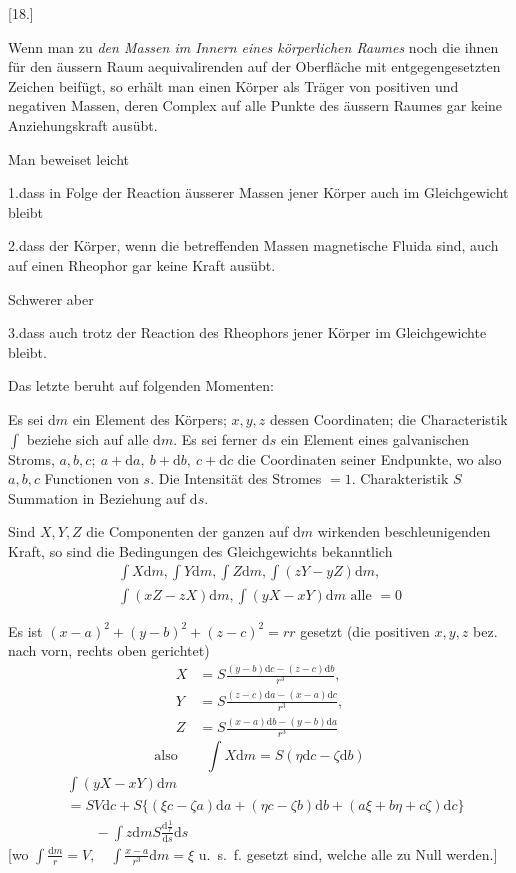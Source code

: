 \begin{center}[18.]\end{center}
Wenn man zu \textit{den Massen im Innern eines körperlichen Raumes} noch die ihnen für den äussern Raum aequivalirenden auf der Oberfläche mit entgegengesetzten Zeichen beifügt, so erhält man einen Körper als Träger von positiven und negativen Massen, deren Complex auf alle Punkte des äussern Raumes gar keine Anziehungskraft ausübt.

Man beweiset leicht

1.\quad dass in Folge der Reaction äusserer Massen jener Körper auch im Gleichgewicht bleibt

2.\quad dass der Körper, wenn die betreffenden Massen magnetische Fluida sind, auch auf einen Rheophor gar keine Kraft ausübt.

Schwerer aber

3.\quad dass auch trotz der Reaction des Rheophors jener Körper im Gleichgewichte bleibt.

Das letzte beruht auf folgenden Momenten:

Es sei $\mathrm dm$ ein Element des Körpers; $x,y,z$ dessen Coordinaten; die Characteristik $\int$ beziehe sich auf alle $\mathrm dm$. Es sei ferner $\mathrm ds$ ein Element eines galvanischen Stroms, $a,b,c;\ a+\mathrm da,\ b+\mathrm db,\ c+\mathrm dc$ die Coordinaten seiner Endpunkte, wo also $a,b,c$ Functionen von $s$. Die Intensität des Stromes $=1$. Charakteristik $S$ Summation in Beziehung auf $\mathrm ds$.

Sind $X,Y,Z$ die Componenten der ganzen auf $\mathrm dm$ wirkenden beschleunigenden Kraft, so sind die Bedingungen des Gleichgewichts bekanntlich
\[
\begin{gathered}
\int X\mathrm dm,\int Y\mathrm dm,\int Z\mathrm dm,\int(zY-yZ)\mathrm dm,\\
\int(xZ-zX)\mathrm dm,\int(yX-xY)\mathrm dm\text{ alle }=0
\end{gathered}
\]

Es ist $(x-a)^2+(y-b)^2+(z-c)^2=rr$ gesetzt (die positiven $x,y,z$ bez. nach vorn, rechts oben gerichtet)
\[
\begin{aligned}
X&=S\frac{(y-b)\mathrm dc-(z-c)\mathrm db}{r^3},\\
Y&=S\frac{(z-c)\mathrm da-(x-a)\mathrm dc}{r^3},\\
Z&=S\frac{(x-a)\mathrm db-(y-b)\mathrm da}{r^3}
\end{aligned}
\]
\[
\text{also}\qquad\int X\mathrm dm=S(\eta\mathrm dc-\zeta\mathrm db)
\]
\[
\begin{aligned}
&\int(yX-xY)\mathrm dm\\
&=SV\mathrm dc+S\{(\xi c-\zeta a)\mathrm da+(\eta c-\zeta b)\mathrm db+(a\xi+b\eta+c\zeta)\mathrm dc\}\\
&\qquad-\int z\mathrm dmS\frac{\mathrm d\frac1r}{\mathrm ds}\mathrm ds
\end{aligned}
\]
[wo $\displaystyle\int\frac{\mathrm dm}{r}=V,\quad\int\frac{x-a}{r^3}\mathrm dm=\xi$ u.\ s.\ f. gesetzt sind, welche alle zu Null werden.]

